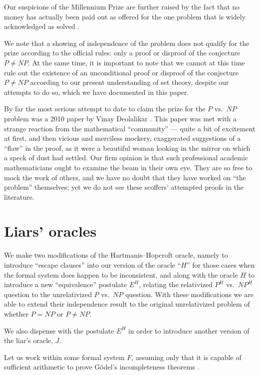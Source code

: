 \documentclass[letterpaper]{article}
\begin{document}
Our suspicions of the Millennium Prize are further raised by the fact that no money has actually been paid out as offered for the one problem that is widely acknowledged as solved \cite{perelman2002,perelman2003,perelman2003-2,rianovosti2010}.

We note that a showing of independence of the problem does not qualify for the prize according to the official rules: only a proof or disproof of the conjecture $P\ne NP$.  At the same time, it is important to note that we cannot at this time rule out the existence of an unconditional proof or disproof of the conjecture $P\ne NP$ according to our present understanding of set theory, despite our attempts to do so, which we have documented in this paper.

By far the most serious attempt to date to claim the prize for the $P$ vs.\ $NP$ problem was a 2010 paper by Vinay Deolalikar \cite{deolalikar2010}. This paper was met with a strange reaction from the mathematical ``community'' --- quite a bit of excitement at first, and then vicious and merciless mockery, exaggerated suggestions of a ``flaw'' in the proof, as it were a beautiful woman looking in the mirror on which a speck of dust had settled.  Our firm opinion is that such professional academic mathematicians ought to examine the beam in their own eye. They are so free to mock the work of others, and we have no doubt that they have worked on ``the problem'' themselves; yet we do not see these scoffers' attempted proofs in the literature.

\section{Liars' oracles}
We make two modifications of the Hartmanis--Hopcroft oracle, namely to introduce ``escape clauses'' into our version of the oracle ``$H$'' for those cases when the formal system does happen to be inconsistent, and along with the oracle $H$ to introduce a new ``equivalence'' postulate $E^H$, relating the relativized $P^H$ vs.\ $NP^H$ question to the unrelativized $P$ vs.\ $NP$ question.  With these modifications we are able to extend their independence result to the original unrelativized problem of whether $P=NP$ or $P\ne NP$.

We also dispense with the postulate $E^H$ in order to introduce another version of the liar's oracle, $J$.

Let us work within some formal system $F$, assuming only that it is capable of sufficient arithmetic to prove G{\"o}del's incompleteness theorems \cite{sep-goedel-incompleteness}.
\end{document}
